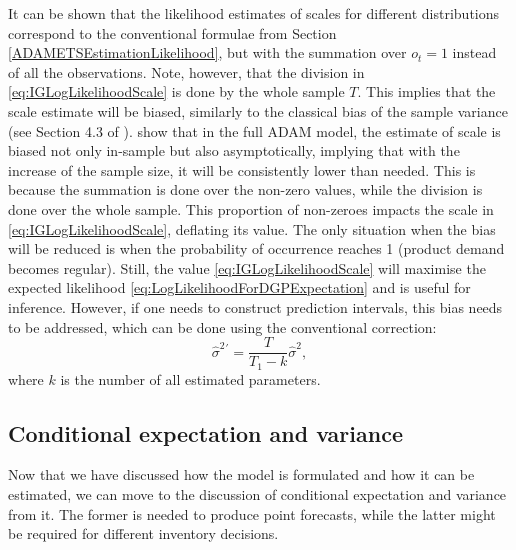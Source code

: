 \documentclass[
]{book}
\theoremstyle{definition}
\theoremstyle{definition}
\theoremstyle{definition}
\theoremstyle{definition}
\theoremstyle{remark}
\begin{document}
It can be shown that the likelihood estimates of scales for different distributions correspond to the conventional formulae from Section \ref{ADAMETSEstimationLikelihood}, but with the summation over \(o_t=1\) instead of all the observations. Note, however, that the division in \eqref{eq:IGLogLikelihoodScale} is done by the whole sample \(T\). This implies that the scale estimate will be biased, similarly to the classical bias of the sample variance (see Section 4.3 of \citet{SvetunkovSBA}). \citet{Svetunkov2019a} show that in the full ADAM model, the estimate of scale is biased not only in-sample but also asymptotically, implying that with the increase of the sample size, it will be consistently lower than needed. This is because the summation is done over the non-zero values, while the division is done over the whole sample. This proportion of non-zeroes impacts the scale in \eqref{eq:IGLogLikelihoodScale}, deflating its value. The only situation when the bias will be reduced is when the probability of occurrence reaches 1 (product demand becomes regular). Still, the value \eqref{eq:IGLogLikelihoodScale} will maximise the expected likelihood \eqref{eq:LogLikelihoodForDGPExpectation} and is useful for inference. However, if one needs to construct prediction intervals, this bias needs to be addressed, which can be done using the conventional correction:
\begin{equation}
    \hat{\sigma}^2{^{\prime}} = \frac{T}{T_1-k} \hat{\sigma}^2,
    \label{eq:scaleFixed}
\end{equation}
where \(k\) is the number of all estimated parameters.

\hypertarget{conditional-expectation-and-variance}{%
\subsection{Conditional expectation and variance}\label{conditional-expectation-and-variance}}

Now that we have discussed how the model is formulated and how it can be estimated, we can move to the discussion of conditional expectation and variance from it. The former is needed to produce point forecasts, while the latter might be required for different inventory decisions.
\end{document}
